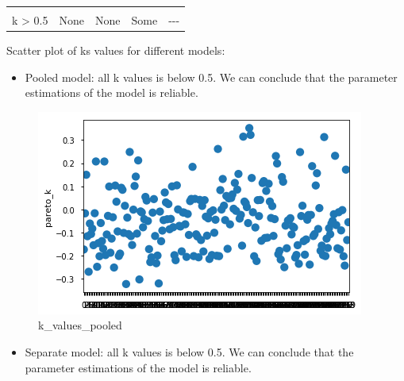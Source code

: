 \documentclass[11pt]{article}
\makeatletter
\def\maxwidth{\ifdim\Gin@nat@width>\linewidth\linewidth
    \else\Gin@nat@width\fi}
\let\Oldincludegraphics\includegraphics
\renewcommand{\includegraphics}[1]{\Oldincludegraphics[width=.8\maxwidth]{#1}}
\providecommand{\tightlist}{%
      \setlength{\itemsep}{0pt}\setlength{\parskip}{0pt}}
\makeatother
\begin{document}
\begin{longtable}[]{@{}lllll@{}}
\begin{minipage}[t]{0.05\columnwidth}
\end{minipage}\tabularnewline
\begin{minipage}[t]{0.05\columnwidth}\raggedright\strut
k \textgreater{} 0.5\strut
\end{minipage} & \begin{minipage}[t]{0.05\columnwidth}\raggedright\strut
None\strut
\end{minipage} & \begin{minipage}[t]{0.05\columnwidth}\raggedright\strut
None\strut
\end{minipage} & \begin{minipage}[t]{0.05\columnwidth}\raggedright\strut
Some\strut
\end{minipage} & \begin{minipage}[t]{0.05\columnwidth}\raggedright\strut
-\/-\/-\strut
\end{minipage}\tabularnewline
\bottomrule
\end{longtable}

Scatter plot of ks values for different models:

\begin{itemize}
\tightlist
\item
  Pooled model: all k values is below 0.5. We can conclude that the
  parameter estimations of the model is reliable.
\end{itemize}

\begin{figure}
\centering
\includegraphics{./Fig/nyc/k_pooled.png}
\caption{k\_values\_pooled}
\end{figure}

\begin{itemize}
\tightlist
\item
  Separate model: all k values is below 0.5. We can conclude that the
  parameter estimations of the model is reliable.
\end{itemize}
\end{document}
